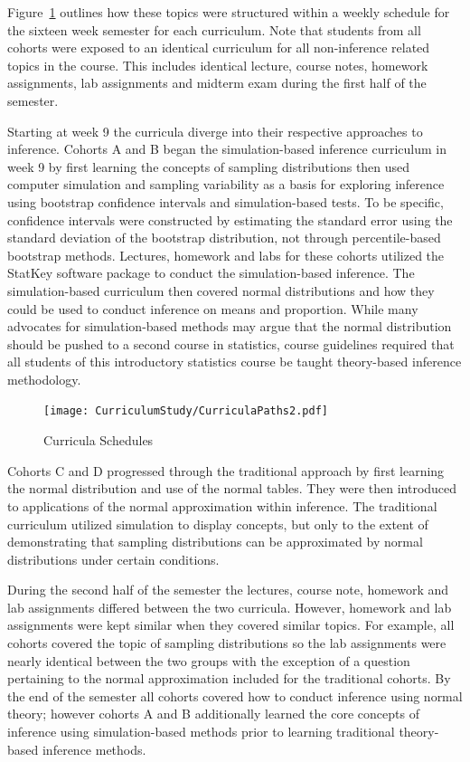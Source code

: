 Figure~\ref{fig:CurricSched} outlines how these topics were structured within a weekly schedule for the sixteen week semester for each curriculum.  Note that students from all cohorts were exposed to an identical curriculum for all non-inference related topics in the course. This includes identical lecture, course notes, homework assignments, lab assignments and midterm exam during the first half of the semester.

Starting at week 9 the curricula diverge into their respective approaches to inference.  Cohorts A and B began the simulation-based inference curriculum in week 9 by first learning the concepts of sampling distributions then used computer simulation and sampling variability as a basis for exploring inference using bootstrap confidence intervals and simulation-based tests.  To be specific, confidence intervals were constructed by estimating the standard error using the standard deviation of the bootstrap distribution, not through percentile-based bootstrap methods.  Lectures, homework and labs for these cohorts utilized the StatKey software package \citep{Lock5} to conduct the simulation-based inference. The simulation-based curriculum then covered normal distributions and how they could be used to conduct inference on means and proportion.  While many advocates for simulation-based methods may argue that the normal distribution should be pushed to a second course in statistics, course guidelines required that all students of this introductory statistics course be taught theory-based inference methodology.  

\begin{figure}[hbtp]
\centering
\texttt{[image: CurriculumStudy/CurriculaPaths2.pdf]}
\caption{\label{fig:CurricSched} Curricula Schedules}
\end{figure}

Cohorts C and D progressed through the traditional approach by first learning the normal distribution and use of the normal tables. They were then introduced to applications of the normal approximation within inference.  The traditional curriculum utilized simulation to display concepts, but only to the extent of demonstrating that sampling distributions can be approximated by normal distributions under certain conditions.  

During the second half of the semester the lectures, course note, homework and lab assignments differed between the two curricula.  However, homework and lab assignments were kept similar when they covered similar topics.  For example, all cohorts covered the topic of sampling distributions so the lab assignments were nearly identical between the two groups with the exception of a question pertaining to the normal approximation included for the traditional cohorts.  By the end of the semester all cohorts covered how to conduct inference using normal theory; however cohorts A and B additionally learned the core concepts of inference using simulation-based methods prior to learning traditional theory-based inference methods.  

